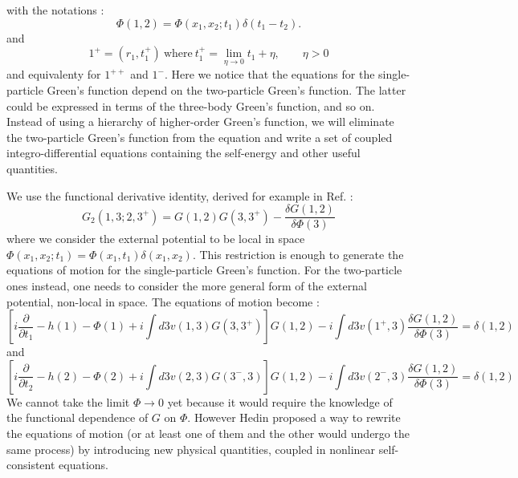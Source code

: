 with the notations : 
\begin{equation}
	\Phi(1,2) = \Phi(x_1,x_2;t_1) \delta(t_1-t_2).
\end{equation}
and 
\begin{equation}
	1^+ = (r_1,t_1^+) \ \text{where} \ t_1^+ = \lim_{\eta \to 0} t_1 + \eta, \qquad \eta > 0
\end{equation}
and equivalenty for $1^{++}$ and $1^-$.
Here we notice that the equations for the single-particle Green's function depend on the two-particle Green's function. The latter could be expressed in terms of the three-body Green's function, and so on. Instead of using a hierarchy of higher-order Green's function, we will eliminate the two-particle Green's function from the equation and write a set of coupled integro-differential equations containing the self-energy and other useful quantities.
%

We use the functional derivative identity, derived for example in Ref. \cite{strinati1988application} :
\begin{equation}
	G_2(1,3;2,3^+) = G(1,2)G(3,3^+) - \frac{\delta G(1,2)}{\delta \Phi(3)} \label{eq:2GF_dPhi}
\end{equation}
where we consider the external potential to be local in space $\Phi(x_1,x_2;t_1) = \Phi(x_1,t_1)\delta(x_1,x_2)$. This restriction is enough to generate the equations of motion for the single-particle Green's function. For the two-particle ones instead, one needs to consider the more general form of the external potential, non-local in space.
The equations of motion become :
\begin{equation}
	\left[ i \frac{\partial}{\partial t_1} - h(1) - \Phi(1) + i \int d3 v(1,3)G(3,3^+) \right] G(1,2) - i \int d3 v(1^+,3) \frac{\delta G(1,2)}{\delta \Phi(3)} = \delta(1,2)
\end{equation}
and
\begin{equation}
	\left[ i \frac{\partial}{\partial t_2} - h(2) - \Phi(2) + i \int d3 v(2,3)G(3^-,3) \right] G(1,2) - i \int d3 v(2^-,3) \frac{\delta G(1,2)}{\delta \Phi(3)} = \delta(1,2)
\end{equation}
We cannot take the limit $\Phi \to 0$ yet because it would require the knowledge of the functional dependence of $G$ on $\Phi$. However Hedin proposed a way to rewrite the equations of motion (or at least one of them and the other would undergo the same process) by introducing new physical quantities, coupled in nonlinear self-consistent equations.\cite{hedin1965new} 
%

